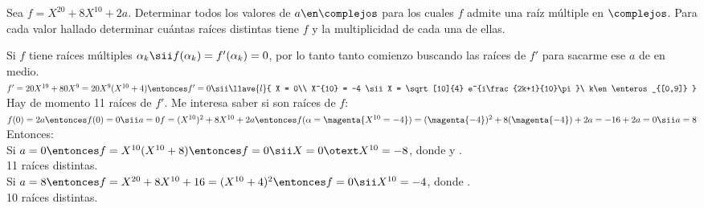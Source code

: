 \ejercicio

Sea $f = X^{20} + 8X^{10} + 2a$. Determinar todos los valores de
$a \en \complejos$ para los cuales $f$ admite una raíz múltiple en
$\complejos$. Para cada valor hallado determinar cuántas raíces
distintas tiene $f$ y la multiplicidad de cada una de ellas.

\separadorCorto

Si $f$ tiene raíces múltiples
$
	\alpha_k
	\sii
	f(\alpha_k) = f'(\alpha_k) =  0$,
por lo tanto  tanto comienzo buscando las raíces de $f'$ para sacarme ese
$a$ de en medio.\\

$
	f' = 20X^{19} + 80 X^9 =
	20 X^9 (X^{10} + 4)
	\entonces
	f' = 0
	\sii
	\llave{l}{
		X = 0\\
		X^{10} = -4
		\sii
		X = \sqrt[10]{4} e^{i\frac{2k+1}{10}\pi}\ k\en \enteros_{[0,9]}
	}
$\\
Hay de momento 11 raíces de $f'$. Me interesa saber si son raíces de $f$:\\
$
	f(0) = 2a
	\entonces
	f(0) = 0
	\sii
	a = 0\\
	f =
	(X^{10})^2 + 8X^{10} + 2a
	\entonces
	f(\alpha = \magenta{X^{10} = -4}) =
	(\magenta{-4})^2 + 8(\magenta{-4}) + 2a =
	-16 + 2a = 0
	\sii
	a = 8
$\\

Entonces:\\
Si
$
	a = 0
	\entonces
	f = X^{10}(X^{10} + 8)\\
	\entonces
	f = 0
	\sii
	X = 0 \otext X^{10} = -8
$, donde
 y
.\\
11 raíces distintas.\\

Si
$
	a = 8
	\entonces
	f = X^{20} + 8X^{10} + 16 = (X^{10} + 4)^2\\
	\entonces
	f = 0
	\sii
	X^{10} = -4
$, donde
.\\
10 raíces distintas.
